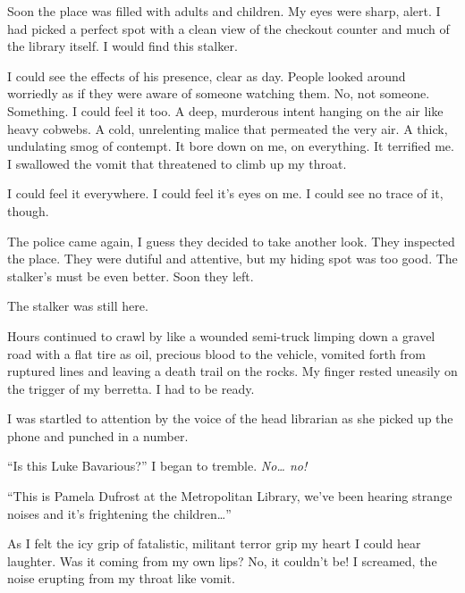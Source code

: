 Soon the place was filled with adults and children. My eyes were
sharp, alert. I had picked a perfect spot with a clean view of the
checkout counter and much of the library itself. I would find this
stalker.



I could see the effects of his presence, clear as day. People
looked around worriedly as if they were aware of someone watching
them. No, not someone. Something. I could feel it too. A deep,
murderous intent hanging on the air like heavy cobwebs. A cold,
unrelenting malice that permeated the very air. A thick, undulating
smog of contempt. It bore down on me, on everything. It terrified
me. I swallowed the vomit that threatened to climb up my
throat.



I could feel it everywhere. I could feel it's eyes on me. I could
see no trace of it, though.



The police came again, I guess they decided to take another look.
They inspected the place. They were dutiful and attentive, but my
hiding spot was too good. The stalker's must be even better. Soon
they left.



The stalker was still here.



Hours continued to crawl by like a wounded semi-truck limping down
a gravel road with a flat tire as oil, precious blood to the
vehicle, vomited forth from ruptured lines and leaving a death
trail on the rocks. My finger rested uneasily on the trigger of my
berretta. I had to be ready.



I was startled to attention by the voice of the head librarian as
she picked up the phone and punched in a number.



``Is this Luke Bavarious?'' I began to tremble. {\em No{\ldots}
no!}



``This is Pamela Dufrost at the Metropolitan Library, we've been
hearing strange noises and it's frightening the
children{\ldots}''



As I felt the icy grip of fatalistic, militant terror grip my heart
I could hear laughter. Was it coming from my own lips? No, it
couldn't be! I screamed, the noise erupting from my throat
like vomit.





